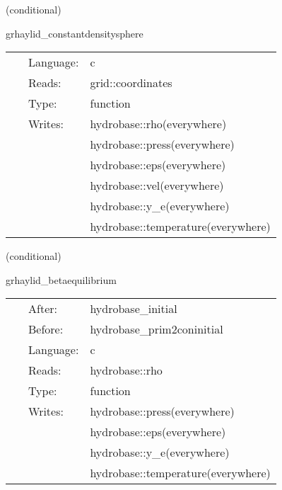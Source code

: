 \documentclass{article}
\begin{document}
   (conditional) 

\hspace{5mm} grhaylid\_constantdensitysphere 

\hspace{5mm}{\it set initial hydrodynamic data for 1d test } 


\hspace{5mm}

 \begin{tabular*}{160mm}{cll} 
~ & Language:  & c \\ 
~ & Reads:  & grid::coordinates \\ 
~ & Type:  & function \\ 
~ & Writes:  & hydrobase::rho(everywhere) \\ 
~& ~ &hydrobase::press(everywhere)\\ 
~& ~ &hydrobase::eps(everywhere)\\ 
~& ~ &hydrobase::vel(everywhere)\\ 
~& ~ &hydrobase::y\_e(everywhere)\\ 
~& ~ &hydrobase::temperature(everywhere)\\ 
\end{tabular*} 


\vspace{5mm}

   (conditional) 

\hspace{5mm} grhaylid\_betaequilibrium 

\hspace{5mm}{\it set y\_e, temperature, entropy, press, eps in neutrino free beta-equilibrium } 


\hspace{5mm}

 \begin{tabular*}{160mm}{cll} 
~ & After:  & hydrobase\_initial \\ 
~ & Before:  & hydrobase\_prim2coninitial \\ 
~ & Language:  & c \\ 
~ & Reads:  & hydrobase::rho \\ 
~ & Type:  & function \\ 
~ & Writes:  & hydrobase::press(everywhere) \\ 
~& ~ &hydrobase::eps(everywhere)\\ 
~& ~ &hydrobase::y\_e(everywhere)\\ 
~& ~ &hydrobase::temperature(everywhere)\\ 
\end{tabular*} 
\end{document}
